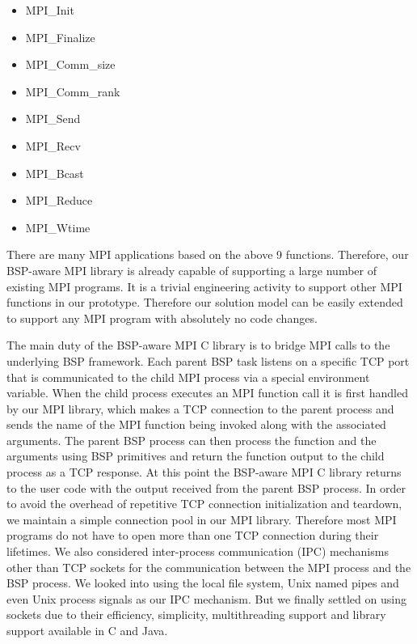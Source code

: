 \documentclass[conference,10pt] {IEEEtran}
\begin{document}
\begin{multicols}{2}
\begin{itemize}
\item MPI\_Init
\item MPI\_Finalize
\item MPI\_Comm\_size
\item MPI\_Comm\_rank
\item MPI\_Send
\item MPI\_Recv
\item MPI\_Bcast
\item MPI\_Reduce
\item MPI\_Wtime
\end{itemize}
\end{multicols}

There are many MPI applications based on the above 9 functions. Therefore, our BSP-aware MPI library is already capable of supporting a large number of existing MPI programs. It is a trivial engineering activity to support other MPI functions in our prototype. Therefore our solution model can be easily extended to support any MPI program with absolutely no code changes.

The main duty of the BSP-aware MPI C library is to bridge MPI calls to the underlying BSP framework. Each parent BSP task listens on a specific TCP port that is communicated to the child MPI process via a special environment variable. When the child process executes an MPI function call it is first handled by our MPI library, which makes a TCP connection to the parent process and sends the name of the MPI function being invoked along with the associated arguments. The parent BSP process can then process the function and the arguments using BSP primitives and return the function output to the child process as a TCP response. At this point the BSP-aware MPI C library returns to the user code with the output received from the parent BSP process. In order to avoid the overhead of repetitive TCP connection initialization and teardown, we maintain a simple connection pool in our MPI library. Therefore most MPI programs do not have to open more than one TCP connection during their lifetimes. We also considered inter-process communication (IPC) mechanisms other than TCP sockets for the communication between the MPI process and the BSP process. We looked into using the local file system, Unix named pipes and even Unix process signals as our IPC mechanism. But we finally settled on using sockets due to their efficiency, simplicity, multithreading support and library support available in C and Java.
\end{document}
